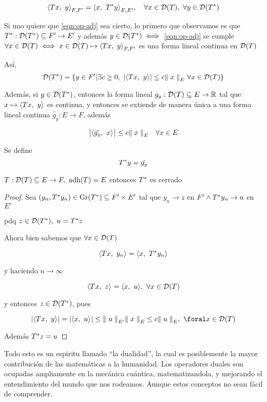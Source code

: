 \begin{equation} \label{eqn:op-adj}
    \prodint[F,F']{Tx}{y} = \prodint[E,E']{x}{T\adj y}, \quad \forall x \in \cd(T),\ \forall y \in \cd(T\adj)
\end{equation}

Si uno quiere que \eqref{eqn:op-adj} sea cierto, lo primero que observamos es que $T\adj : \cd(T\adj) \subseteq F' \to E' $ y además $y \in \cd(T\adj) \iff $ \eqref{eqn:op-adj} se cumple $ \forall x \in \cd(T) \iff x \in \cd(T) \mapsto \prodint[F, F']{Tx}{y} $ es una forma lineal continua en $\cd(T)$

Así, $$ \cd(T\adj) = \{ y  \in F' | \exists c \geq 0 ,\ \abs{ \prodint{Tx}{y} } \leq c \norm[E]{x} \ \forall x \in \cd(T) \} $$

Además, si $y \in \cd(T\adj)$, entonces la forma lineal $g_y : \cd(T) \subseteq E \to \rr $ tal que $ x \mapsto \prodint{Tx}{y} $ es continua, y entonces se extiende de manera única a una forma lineal continua $\tilde{g_y} : E \to F$, además 

$$ \abs{\prodint{ \tilde{g_y} }{x}} \leq c \norm[E]{x} \quad \forall x \in E$$

Se define $$ T\adj y = \tilde{g_y} $$

\begin{prop}
$T: \cd(T) \subseteq E \to F,\ \adh (T) = E$ entonces $T\adj$ es cerrado
\end{prop}

\begin{proof}
Sea $(y_n, T\adj y_n) \in \gr (T\adj) \subseteq F' \times E'$ tal que $y_n \to z $ en $F' \wedge T\adj y_n \to u$  en $E'$

pdq $z \in \cd(T\adj) ,\ u = T\adj z $

Ahora bien sabemos que $\forall x \in \cd(T)$

$$ \prodint{Tx}{y_n} = \prodint{x}{T\adj y_n} $$

y haciendo $n \to \infty$

$$ \prodint{Tx}{z} = \prodint{x}{u} ,\ \forall x \in \cd(T) $$

y entonces $z \in \cd(T\adj)$, pues

$$ \abs{ \prodint{Tx}{y} } = \abs{ \prodint{x}{u} } \leq \norm[E']{u} \norm[E]{x} \leq c \norm[E]{u} ,\ \foral x \in \cd(T) $$

Además $T\adj z = u$
\end{proof}

Todo esto es un espiritu llamado ``la dualidad'', la cual es posiblemente la mayor contribución de las matemáticas a la humanidad. Los operadores duales son ocupadas ampliamente en la mecánica cuántica, matematizandola, y mejorando el entendimiento del mundo que nos rodeamos. Aunque estos conceptos no sean fácil de comprender.

